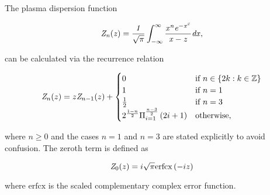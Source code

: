 \documentclass[12pt]{iopart}
\begin{document}
\section{}

The plasma dispersion function\cite{Fried1961}

\begin{equation}
\it{Z}_n(z)=\frac{1}{\sqrt{\pi}}\int_{-\infty}^{\infty}\frac{x^n e^{-x^2}}{x-z}dx,
\end{equation}

\noindent can be calculated via the recurrence relation\cite{Sampoorna2007}

\begin{equation}
{\it Z}_n(z) = z {\it Z}_{n-1}(z) + \begin{cases}
0 & \text{if } n \in \{2k : k \in \mathbb{Z}\}
\\
1 & \text{if } n = 1
\\
\frac{1}{2} & \text{if } n = 3
\\
2^{\frac{1-n}{2}} \Pi_{i=1}^{\frac{n-3}{2}} \left( 2i + 1 \right) & \text{otherwise},
\end{cases}
\end{equation}

\noindent where $n \geq 0$ and the cases $n=1$ and $n=3$ are stated explicitly to avoid confusion. The zeroth term is defined as

\begin{equation}
 {\it Z}_0(z) = i \sqrt{\pi} \mathrm{erfcx} \left(-i z \right)
\end{equation}

\noindent where $\mathrm{erfcx}$ is the scaled complementary complex error function.

\newpage



\end{document}
